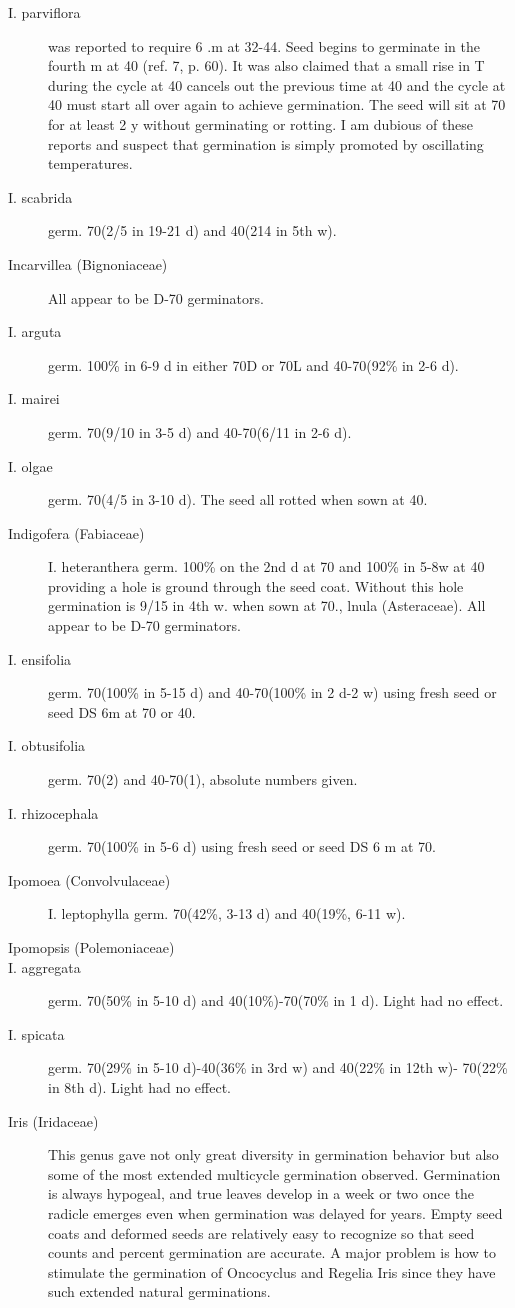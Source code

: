 \begin{description}
\item[I. parviflora] was reported to require 6 .m at 32-44. Seed begins to germinate in
the fourth m at 40 (ref. 7, p. 60). It was also claimed that a small rise in T during the
cycle at 40 cancels out the previous time at 40 and the cycle at 40 must start all over
again to achieve germination. The seed will sit at 70 for at least 2 y without
germinating or rotting. I am dubious of these reports and suspect that germination is
simply promoted by oscillating temperatures.
\item[I. scabrida] germ. 70(2/5 in 19-21 d) and 40(214 in 5th w).

\item[Incarvillea (Bignoniaceae)] All appear to be D-70 germinators.
\item[I. arguta] germ. 100\% in 6-9 d in either 70D or 70L and 40-70(92\% in 2-6 d).
\item[I. mairei] germ. 70(9/10 in 3-5 d) and 40-70(6/11 in 2-6 d).
\item[I. olgae] germ. 70(4/5 in 3-10 d). The seed all rotted when sown at 40.

\item[Indigofera (Fabiaceae)] I. heteranthera germ. 100\% on the 2nd d at 70 and
100\% in 5-8w at 40 providing a hole is ground through the seed coat. Without this
hole germination is 9/15 in 4th w. when sown at 70.,
lnula (Asteraceae). All appear to be D-70 germinators.
\item[I. ensifolia] germ. 70(100\% in 5-15 d) and 40-70(100\% in 2 d-2 w) using fresh
seed or seed DS 6m at 70 or 40.
\item[I. obtusifolia] germ. 70(2) and 40-70(1), absolute numbers given.
\item[I. rhizocephala] germ. 70(100\% in 5-6 d) using fresh seed or seed DS 6 m at 70.

\item[Ipomoea (Convolvulaceae)] I. leptophylla germ. 70(42\%, 3-13 d) and
40(19\%, 6-11 w).
\item[Ipomopsis (Polemoniaceae)]
\item[I. aggregata] germ. 70(50\% in 5-10 d) and 40(10\%)-70(70\% in 1 d). Light had
no effect.
\item[I. spicata] germ. 70(29\% in 5-10 d)-40(36\% in 3rd w) and 40(22\% in 12th w)-
70(22\% in 8th d). Light had no effect.

\item[Iris (Iridaceae)] This genus gave not only great diversity in germination
behavior but also some of the most extended multicycle germination observed.
Germination is always hypogeal, and true leaves develop in a week or two once the
radicle emerges even when germination was delayed for years. Empty seed coats
and deformed seeds are relatively easy to recognize so that seed counts and percent
germination are accurate. A major problem is how to stimulate the germination of
Oncocyclus and Regelia Iris since they have such extended natural germinations.


\end{description}
